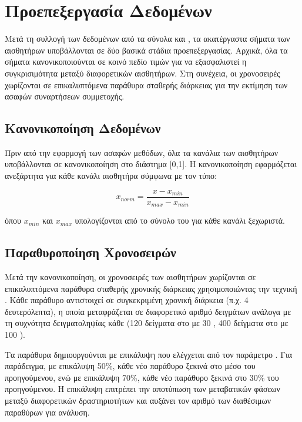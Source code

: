 \section{Προεπεξεργασία Δεδομένων}
\label{sec:data-preprocessing}

Μετά τη συλλογή των δεδομένων από τα σύνολα  και , τα ακατέργαστα σήματα των αισθητήρων υποβάλλονται σε δύο βασικά στάδια προεπεξεργασίας.
Αρχικά, όλα τα σήματα κανονικοποιούνται σε κοινό πεδίο τιμών για να εξασφαλιστεί η συγκρισιμότητα μεταξύ διαφορετικών αισθητήρων.
Στη συνέχεια, οι χρονοσειρές χωρίζονται σε επικαλυπτόμενα παράθυρα σταθερής διάρκειας για την εκτίμηση των ασαφών συναρτήσεων συμμετοχής.

\subsection{Κανονικοποίηση Δεδομένων}
\label{subsec:normalization}

Πριν από την εφαρμογή των ασαφών μεθόδων, όλα τα κανάλια των αισθητήρων υποβάλλονται σε  κανονικοποίηση στο διάστημα [0,1].
Η κανονικοποίηση εφαρμόζεται ανεξάρτητα για κάθε κανάλι αισθητήρα σύμφωνα με τον τύπο:

\begin{equation}
x_{norm} = \frac{x - x_{min}}{x_{max} - x_{min}}
\end{equation}

όπου $x_{min}$ και $x_{max}$ υπολογίζονται από το σύνολο του  για κάθε κανάλι ξεχωριστά.

\subsection{Παραθυροποίηση Χρονοσειρών}
\label{subsec:windowing}

Μετά την κανονικοποίηση, οι χρονοσειρές των αισθητήρων χωρίζονται σε επικαλυπτόμενα παράθυρα σταθερής χρονικής διάρκειας χρησιμοποιώντας την τεχνική .
Κάθε παράθυρο αντιστοιχεί σε συγκεκριμένη χρονική διάρκεια (π.χ. 4 δευτερόλεπτα), η οποία μεταφράζεται σε διαφορετικό αριθμό δειγμάτων ανάλογα με τη συχνότητα δειγματοληψίας κάθε  (120 δείγματα στο  με 30 , 400 δείγματα στο  με 100 ).

Τα παράθυρα δημιουργούνται με επικάλυψη που ελέγχεται από τον παράμετρο .
Για παράδειγμα, με επικάλυψη 50\%, κάθε νέο παράθυρο ξεκινά στο μέσο του προηγούμενου, ενώ με επικάλυψη 70\%, κάθε νέο παράθυρο ξεκινά στο 30\% του προηγούμενου.
Η επικάλυψη επιτρέπει την αποτύπωση των μεταβατικών φάσεων μεταξύ διαφορετικών δραστηριοτήτων και αυξάνει τον αριθμό των διαθέσιμων παραθύρων για ανάλυση.

